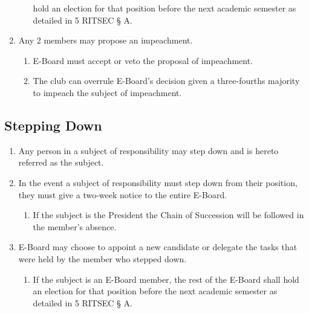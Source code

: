 \begin{enumerate}
\begin{enumerate}
      hold an election for that position before the next academic semester as
      detailed in 5 RITSEC § A.
  \end{enumerate}
  \item Any 2 members may propose an impeachment.
  \begin{enumerate}
    \item E-Board must accept or veto the proposal of impeachment.
    \item The club can overrule E-Board's decision given a three-fourths
      majority to impeach the subject of impeachment.
  \end{enumerate}
\end{enumerate}

\subsection{Stepping Down}

\begin{enumerate}
  \item Any person in a subject of responsibility may step down and is hereto
    referred as the subject.
  \item In the event a subject of responsibility must step down from their
    position, they must give a two-week notice to the entire E-Board.
  \begin{enumerate}
    \item If the subject is the President the Chain of Succession will be
      followed in the member’s absence.
  \end{enumerate}
  \item E-Board may choose to appoint a new candidate or delegate the tasks
    that were held by the member who stepped down.
  \begin{enumerate}
    \item If the subject is an E-Board member, the rest of the E-Board shall
      hold an election for that position before the next academic semester as
      detailed in 5 RITSEC § A.
  \end{enumerate}
\end{enumerate}
